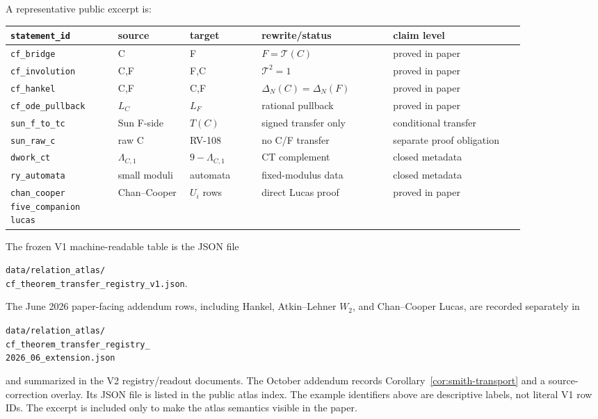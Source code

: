 \documentclass[11pt,a4paper]{article}
\begin{document}
A representative public excerpt is:
\begin{center}
\scriptsize
\begin{tabular}{@{}p{0.18\linewidth}p{0.12\linewidth}p{0.12\linewidth}p{0.22\linewidth}p{0.22\linewidth}@{}}
\hline
\texttt{statement\_id} & source & target & rewrite/status & claim level\\
\hline
\texttt{cf\_bridge} & C & F & $F=\mathcal{T}(C)$ & proved in paper\\
\texttt{cf\_involution} & C,F & F,C & $\mathcal{T}^2=1$ & proved in paper\\
\texttt{cf\_hankel} & C,F & C,F & $\Delta_N(C)=\Delta_N(F)$ & proved in paper\\
\texttt{cf\_ode\_pullback} & $L_C$ & $L_F$ & rational pullback & proved in paper\\
\texttt{sun\_f\_to\_tc} & Sun F-side & $T(C)$ & signed transfer only & conditional transfer\\
\texttt{sun\_raw\_c} & raw C & RV-108 & no C/F transfer & separate proof obligation\\
\texttt{dwork\_ct} & $\Lambda_{C,1}$ & $9-\Lambda_{C,1}$ & CT complement & closed metadata\\
\texttt{ry\_automata} & small moduli & automata & fixed-modulus data & closed metadata\\
\shortstack[l]{\texttt{chan\_cooper}\\\texttt{five\_companion}\\\texttt{lucas}} & Chan--Cooper & $U_i$ rows & direct Lucas proof & proved in paper\\
\hline
\end{tabular}
\end{center}
The frozen V1 machine-readable table is the JSON file
\begin{center}
\texttt{data/relation\_atlas/}\\
\texttt{cf\_theorem\_transfer\_registry\_v1.json}.
\end{center}
The June 2026 paper-facing addendum rows, including Hankel, Atkin--Lehner
$W_2$, and Chan--Cooper Lucas, are recorded separately in
\begin{center}
\texttt{data/relation\_atlas/}\\
\texttt{cf\_theorem\_transfer\_registry\_}\\
\texttt{2026\_06\_extension.json}
\end{center}
and summarized in the V2 registry/readout documents.  The October addendum
records Corollary~\ref{cor:smith-transport} and a source-correction overlay.
Its JSON file is listed in the public atlas index.  The example identifiers
above are descriptive labels, not literal V1 row IDs.  The excerpt is included
only to make the atlas semantics visible in the paper.
\end{document}
